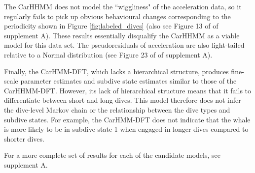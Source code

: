 The CarHHMM does not model the ``wiggliness" of the acceleration data, so it regularly fails to pick up obvious behavioural changes corresponding to the periodicity shown in Figure \ref{fig:labeled_dives} (also see Figure 13 of of supplement A). These results essentially disqualify the CarHHMM as a viable model for this data set. The pseudoresiduals of acceleration are also light-tailed relative to a Normal distribution (see Figure 23 of of supplement A).

Finally, the CarHMM-DFT, which lacks a hierarchical structure, produces fine-scale parameter estimates and subdive state estimates similar to those of the CarHHMM-DFT. However, its lack of hierarchical structure means that it fails to differentiate between short and long dives. This model therefore does not infer the dive-level Markov chain or the relationship between the dive types and subdive states. For example, the CarHMM-DFT does not indicate that the whale is more likely to be in subdive state 1 when engaged in longer dives compared to shorter dives. 

For a more complete set of results for each of the candidate models, see supplement A.